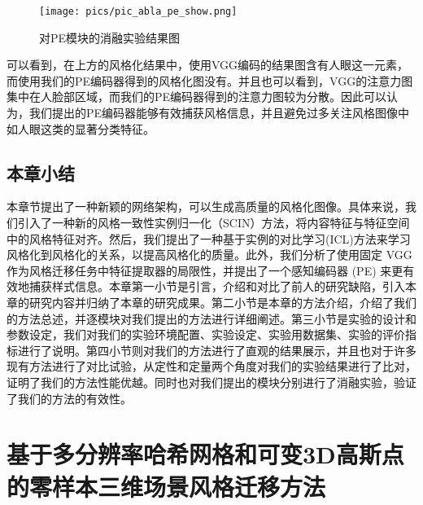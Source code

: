 \begin{figure}[htb]
    \centering
    \texttt{[image: pics/pic\_abla\_pe\_show.png]}
    \caption{\label{fig:pic_abla_pe}对PE模块的消融实验结果图}
\end{figure}可以看到，在上方的风格化结果中，使用VGG编码的结果图含有人眼这一元素，而使用我们的PE编码器得到的风格化图没有。并且也可以看到，VGG的注意力图集中在人脸部区域，而我们的PE编码器得到的注意力图较为分散。因此可以认为，我们提出的PE编码器能够有效捕获风格信息，并且避免过多关注风格图像中如人眼这类的显著分类特征。
\section{本章小结}
本章节提出了一种新颖的网络架构，可以生成高质量的风格化图像。具体来说，我们引入了一种新的风格一致性实例归一化（SCIN）方法，将内容特征与特征空间中的风格特征对齐。然后，我们提出了一种基于实例的对比学习(ICL)方法来学习风格化到风格化的关系，以提高风格化的质量。此外，我们分析了使用固定 VGG 作为风格迁移任务中特征提取器的局限性，并提出了一个感知编码器 (PE) 来更有效地捕获样式信息。本章第一小节是引言，介绍和对比了前人的研究缺陷，引入本章的研究内容并归纳了本章的研究成果。第二小节是本章的方法介绍，介绍了我们的方法总述，并逐模块对我们提出的方法进行详细阐述。第三小节是实验的设计和参数设定，我们对我们的实验环境配置、实验设定、实验用数据集、实验的评价指标进行了说明。第四小节则对我们的方法进行了直观的结果展示，并且也对于许多现有方法进行了对比试验，从定性和定量两个角度对我们的实验结果进行了比对，证明了我们的方法性能优越。同时也对我们提出的模块分别进行了消融实验，验证了我们的方法的有效性。


\chapter{基于多分辨率哈希网格和可变3D高斯点的零样本三维场景风格迁移方法}

